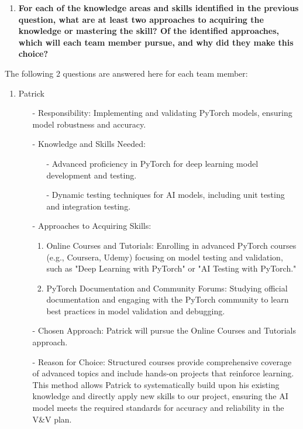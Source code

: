 \documentclass[12pt, titlepage]{article}
\begin{document}
\begin{enumerate}
\begin{enumerate}
\begin{enumerate}
\begin{enumerate}
  \item \textbf{For each of the knowledge areas and skills identified in the previous
  question, what are at least two approaches to acquiring the knowledge or
  mastering the skill?  Of the identified approaches, which will each team
  member pursue, and why did they make this choice?}
\end{enumerate}
The following 2 questions are answered here for each team member:

\begin{enumerate}
  \item Patrick

  \begin{itemize}
      \item[-]Responsibility: Implementing and validating PyTorch models, ensuring model robustness and accuracy.
      \item[-] Knowledge and Skills Needed:
      \begin{itemize}
          \item[-] Advanced proficiency in PyTorch for deep learning model development and testing.
          \item[-] Dynamic testing techniques for AI models, including unit testing and integration testing.
      \end{itemize}
      \item[-] Approaches to Acquiring Skills:
      \begin{enumerate}
          \item Online Courses and Tutorials: Enrolling in advanced PyTorch courses (e.g., Coursera, Udemy) focusing on model testing and validation, such as "Deep Learning with PyTorch" or "AI Testing with PyTorch."
          \item PyTorch Documentation and Community Forums: Studying official documentation and engaging with the PyTorch community to learn best practices in model validation and debugging.
      \end{enumerate}
      \item[-] Chosen Approach: Patrick will pursue the Online Courses and Tutorials approach.
      \item[-] Reason for Choice: Structured courses provide comprehensive coverage of advanced topics and include hands-on projects that reinforce learning. This method allows Patrick to systematically build upon his existing knowledge and directly apply new skills to our project, ensuring the AI model meets the required standards for accuracy and reliability in the V\&V plan.
  \end{itemize}


\end{enumerate}
\end{enumerate}
\end{enumerate}
\end{enumerate}
\end{document}
